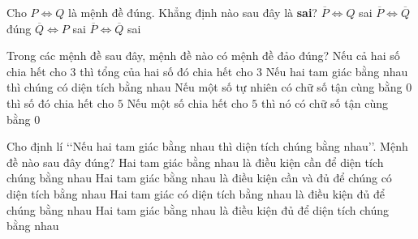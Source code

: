 \begin{ex}%
	Cho $P \Leftrightarrow Q$  là mệnh đề đúng. Khẳng định nào sau đây là \textbf{sai}?
	 \choice
		{$\overline{P} \Leftrightarrow Q$ sai} 
		{$\overline{P} \Leftrightarrow \overline{Q}$  đúng}
		{$\overline{Q} \Leftrightarrow P$ sai} 
		 {\True $\overline{P} \Leftrightarrow \overline{Q}$ sai}
\end{ex}

\begin{ex}%
	Trong các mệnh đề sau đây, mệnh đề nào có mệnh đề  đảo đúng?
	\choice 
		{Nếu cả hai số chia hết cho $3$ thì tổng của  hai số đó chia hết cho $3$}
		{Nếu hai tam giác bằng nhau thì chúng  có diện tích bằng nhau}
		{Nếu một  số tự nhiên có chữ số tận cùng bằng $0$ thì số đó chia hết cho $5$ }
		{\True Nếu một số chia hết cho $5$ thì nó có chữ  số tận cùng bằng $0$}
\end{ex}

\begin{ex}%
	Cho định lí \lq\lq  Nếu hai tam giác bằng nhau thì diện tích chúng bằng nhau\rq\rq. Mệnh đề nào sau đây đúng?
	 \choice
		{\True Hai tam  giác bằng nhau là điều kiện cần để diện tích chúng bằng nhau}
		{Hai tam giác bằng nhau là điều  kiện cần và đủ để chúng có diện tích bằng nhau}
		{Hai tam giác có diện tích bằng nhau  là điều kiện đủ để chúng bằng nhau}
		{Hai tam giác bằng nhau là điều kiện đủ  để diện tích chúng bằng nhau}
\end{ex}

